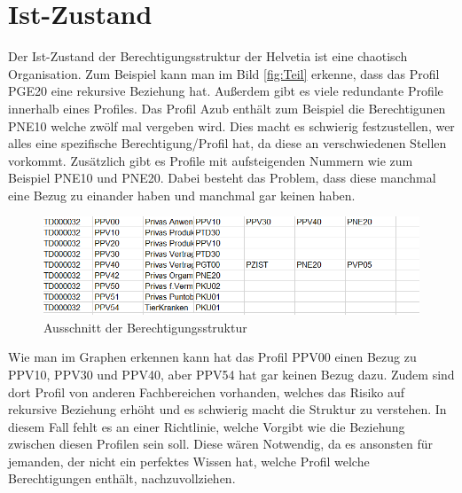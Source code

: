 \section{Ist-Zustand}
\label{sec:chapter03:Ist-Zustand}
Der Ist-Zustand der Berechtigungsstruktur der Helvetia ist eine chaotisch Organisation.
Zum Beispiel kann man im Bild \ref{fig:Teil} erkenne, dass das Profil PGE20 eine rekursive Beziehung hat.
Außerdem gibt es viele redundante Profile innerhalb eines Profiles.
Das Profil Azub enthält zum Beispiel die Berechtigunen PNE10 welche zwölf mal vergeben wird.
Dies macht es schwierig festzustellen, wer alles eine spezifische Berechtigung/Profil hat, da diese an verschwiedenen Stellen vorkommt.
\newline
Zusätzlich gibt es Profile mit aufsteigenden Nummern wie zum Beispiel PNE10 und PNE20.
Dabei besteht das Problem, dass diese manchmal eine Bezug zu einander haben und manchmal gar keinen haben.
\begin{figure}[h!]
 \centering
 \includegraphics[width=1\textwidth]{gfx/Picture/Beispiel.PNG}
 \caption{Ausschnitt der Berechtigungsstruktur}
 \label{fig:Profile}
\end{figure}
Wie man im Graphen erkennen kann hat das Profil PPV00 einen Bezug zu PPV10, PPV30 und PPV40, aber PPV54 hat gar keinen Bezug dazu.
Zudem sind dort Profil von anderen Fachbereichen vorhanden, welches das Risiko auf rekursive Beziehung erhöht und es schwierig macht die Struktur zu verstehen.
In diesem Fall fehlt es an einer Richtlinie, welche Vorgibt wie die Beziehung zwischen diesen Profilen sein soll.
Diese wären Notwendig, da es ansonsten für jemanden, der nicht ein perfektes Wissen hat, welche Profil welche Berechtigungen enthält, nachzuvollziehen.